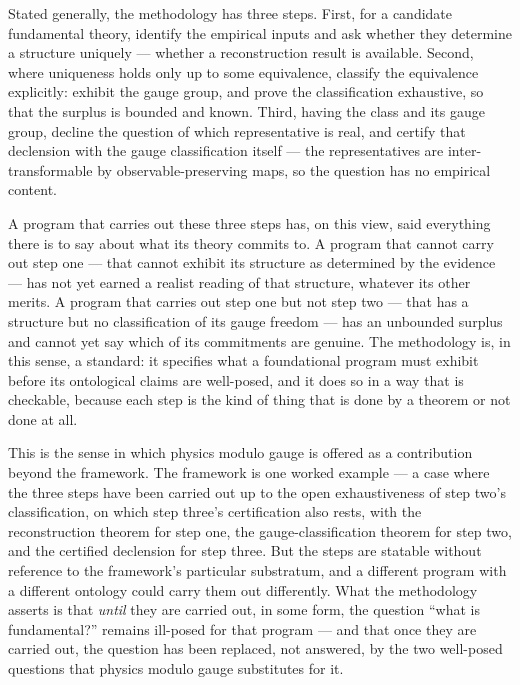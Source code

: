\documentclass[
]{article}
\begin{document}
Stated generally, the methodology has three steps. First, for a
candidate fundamental theory, identify the empirical inputs and ask
whether they determine a structure uniquely --- whether a reconstruction
result is available. Second, where uniqueness holds only up to some
equivalence, classify the equivalence explicitly: exhibit the gauge
group, and prove the classification exhaustive, so that the surplus is
bounded and known. Third, having the class and its gauge group, decline
the question of which representative is real, and certify that
declension with the gauge classification itself --- the representatives
are inter-transformable by observable-preserving maps, so the question
has no empirical content.

A program that carries out these three steps has, on this view, said
everything there is to say about what its theory commits to. A program
that cannot carry out step one --- that cannot exhibit its structure as
determined by the evidence --- has not yet earned a realist reading of
that structure, whatever its other merits. A program that carries out
step one but not step two --- that has a structure but no classification
of its gauge freedom --- has an unbounded surplus and cannot yet say
which of its commitments are genuine. The methodology is, in this sense,
a standard: it specifies what a foundational program must exhibit before
its ontological claims are well-posed, and it does so in a way that is
checkable, because each step is the kind of thing that is done by a
theorem or not done at all.

This is the sense in which physics modulo gauge is offered as a
contribution beyond the framework. The framework is one worked example
--- a case where the three steps have been carried out up to the open
exhaustiveness of step two's classification, on which step three's
certification also rests, with the reconstruction theorem for step one,
the gauge-classification theorem for step two, and the certified
declension for step three. But the steps are statable without reference
to the framework's particular substratum, and a different program with a
different ontology could carry them out differently. What the
methodology asserts is that \emph{until} they are carried out, in some
form, the question ``what is fundamental?'' remains ill-posed for that
program --- and that once they are carried out, the question has been
replaced, not answered, by the two well-posed questions that physics
modulo gauge substitutes for it.
\end{document}
